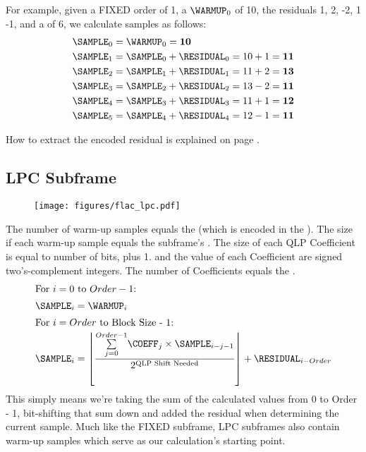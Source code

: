 For example, given a FIXED order of 1, a $\WARMUP_0$ of 10,
the residuals 1, 2, -2, 1 -1, and a  of 6, we calculate
samples as follows:
\begin{align*}
\SAMPLE_0 &= \WARMUP_0 = \textbf{10} \\
\SAMPLE_1 &= \SAMPLE_0 + \RESIDUAL_0 = 10 + 1 = \textbf{11} \\
\SAMPLE_2 &= \SAMPLE_1 + \RESIDUAL_1 = 11 + 2 = \textbf{13} \\
\SAMPLE_3 &= \SAMPLE_2 + \RESIDUAL_2 = 13 - 2 = \textbf{11} \\
\SAMPLE_4 &= \SAMPLE_3 + \RESIDUAL_3 = 11 + 1 = \textbf{12} \\
\SAMPLE_5 &= \SAMPLE_4 + \RESIDUAL_4 = 12 - 1 = \textbf{11}
\end{align*}
\par
\noindent
How to extract the encoded residual is explained on page
\pageref{flac_residual}.

\clearpage

\subsection{LPC Subframe}
\begin{figure}[h]
\texttt{[image: figures/flac\_lpc.pdf]}
\end{figure}
\par
\noindent
The number of warm-up samples equals the 
(which is encoded in the ).
The size if each warm-up sample equals the subframe's .
The size of each QLP Coefficient is equal to
 number of bits, plus 1.
 and the value of each Coefficient are
signed two's-complement integers.
The number of Coefficients equals the .
\begin{align*}
\intertext{For $i = 0$ to $Order - 1$:}
\SAMPLE_i &= \WARMUP_i \\
\intertext{For $i = Order$ to Block Size - 1:}
\SAMPLE_i &= \left\lfloor \frac{\overset{Order - 1}{\underset{j = 0}{\sum}}
  \COEFF_j \times \SAMPLE_{i - j - 1} } {2 ^ \text{QLP Shift Needed}}\right\rfloor + \RESIDUAL_{i - Order}
\end{align*}
This simply means we're taking the sum of the calculated values from
0 to Order - 1, bit-shifting that sum down and added the residual
when determining the current sample.
Much like the FIXED subframe, LPC subframes also contain warm-up
samples which serve as our calculation's starting point.


